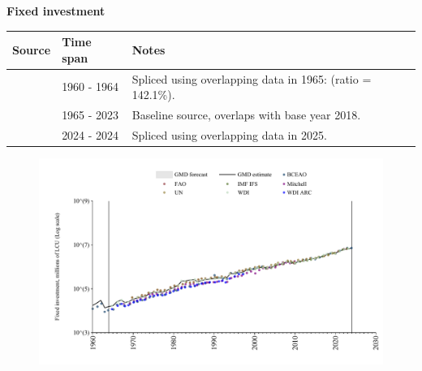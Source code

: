 \documentclass[12pt,a4paper,landscape]{article}
\begin{document}
\begin{adjustbox}{max totalsize={\paperwidth}{\paperheight},center}
\begin{minipage}[t][\textheight][t]{\textwidth}
\vspace*{0.5cm}
{}
\begin{center}
{\Large\bfseries Fixed investment}
\end{center}
\vspace{0.5cm}
\begin{table}[H]
\centering
\small
\begin{tabular}{|l|l|l|}
\hline
\textbf{Source} & \textbf{Time span} & \textbf{Notes} \\
\hline
\rowcolor{white}\cite{BCEAO}& 1960 - 1964 &Spliced using overlapping data in 1965: (ratio = 142.1\%). \\
\rowcolor{lightgray}\cite{WDI}& 1965 - 2023 &Baseline source, overlaps with base year 2018. \\
\rowcolor{white}\cite{BCEAO}& 2024 - 2024 &Spliced using overlapping data in 2025. \\
\hline
\end{tabular}
\end{table}
\begin{figure}[H]
\centering
\includegraphics[width=\textwidth,height=0.6\textheight,keepaspectratio]{graphs/SEN_finv.pdf}
\end{figure}
\end{minipage}
\end{adjustbox}
\end{document}
